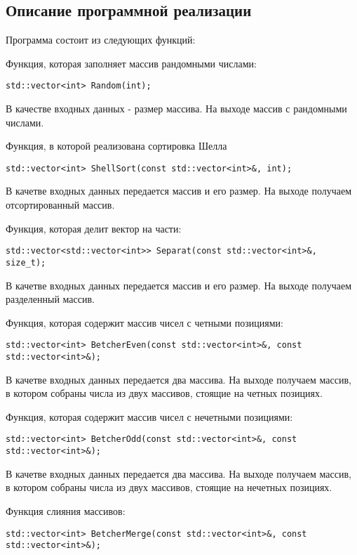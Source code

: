 \documentclass{report}
\begin{document}
\begin{center}
\section*{Описание программной реализации}
\end{center}
\par Программа состоит из следующих функций:
\par Функция, которая заполняет массив рандомными числами:
\begin{lstlisting}
std::vector<int> Random(int);
\end{lstlisting}
В качестве входных данных - размер массива. На выходе массив с рандомными числами.
\par Функция, в которой реализована сортировка Шелла
\begin{lstlisting}
std::vector<int> ShellSort(const std::vector<int>&, int);
\end{lstlisting}
В качетве входных данных передается массив и его размер. На выходе получаем отсортированный массив.
\par Функция, которая делит вектор на части:
\begin{lstlisting}
std::vector<std::vector<int>> Separat(const std::vector<int>&, size_t);
\end{lstlisting}
В качетве входных данных передается массив и его размер. На выходе получаем разделенный массив.
\par Функция, которая содержит массив чисел с четными позициями:
\begin{lstlisting}
std::vector<int> BetcherEven(const std::vector<int>&, const std::vector<int>&);
\end{lstlisting}
В качетве входных данных передается два массива. На выходе получаем массив, в котором собраны числа из двух массивов, стоящие на четных позициях.
\par Функция, которая содержит массив чисел с нечетными позициями:
\begin{lstlisting}
std::vector<int> BetcherOdd(const std::vector<int>&, const std::vector<int>&);
\end{lstlisting}
В качетве входных данных передается два массива. На выходе получаем массив, в котором собраны числа из двух массивов, стоящие на нечетных позициях.
\par Функция слияния массивов:
\begin{lstlisting}
std::vector<int> BetcherMerge(const std::vector<int>&, const std::vector<int>&);
\end{lstlisting}
\end{document}
